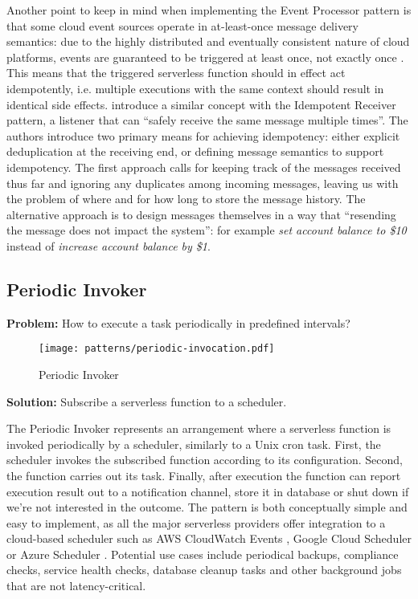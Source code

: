 Another point to keep in mind when implementing the Event Processor pattern is that some cloud event sources operate in at-least-once message delivery semantics: due to the highly distributed and eventually consistent nature of cloud platforms, events are guaranteed to be triggered at least once, not exactly once \parencite{awslambda0218}. This means that the triggered serverless function should in effect act idempotently, i.e. multiple executions with the same context should result in identical side effects. \textcite{hohpe2004enterprise} introduce a similar concept with the Idempotent Receiver pattern, a listener that can ``safely receive the same message multiple times''. The authors introduce two primary means for achieving idempotency: either explicit deduplication at the receiving end, or defining message semantics to support idempotency. The first approach calls for keeping track of the messages received thus far and ignoring any duplicates among incoming messages, leaving us with the problem of where and for how long to store the message history. The alternative approach is to design messages themselves in a way that ``resending the message does not impact the system'': for example \textit{set account balance to \$10} instead of \textit{increase account balance by \$1}.

\subsection{Periodic Invoker} \label{subsec:periodicInvocation}

\textbf{Problem:} How to execute a task periodically in predefined intervals?

\begin{figure}[h]
  \centering
  \texttt{[image: patterns/periodic-invocation.pdf]}
  \caption{Periodic Invoker}
  \label{fig:patternPeriodicInvocation}
\end{figure}

\textbf{Solution:} Subscribe a serverless function to a scheduler.

The Periodic Invoker represents an arrangement where a serverless function is invoked periodically by a scheduler, similarly to a Unix cron task. First, the scheduler invokes the subscribed function according to its configuration. Second, the function carries out its task. Finally, after execution the function can report execution result out to a notification channel, store it in database or shut down if we're not interested in the outcome. The pattern is both conceptually simple and easy to implement, as all the major serverless providers offer integration to a cloud-based scheduler such as AWS CloudWatch Events \parencite{awslambda0218}, Google Cloud Scheduler \parencite{google18cloudFunctions} or Azure Scheduler \parencite{microsoft18azureFunctions}. Potential use cases include periodical backups, compliance checks, service health checks, database cleanup tasks and other background jobs that are not latency-critical. \parencite{hong18securingviaserverlesspatterns}


